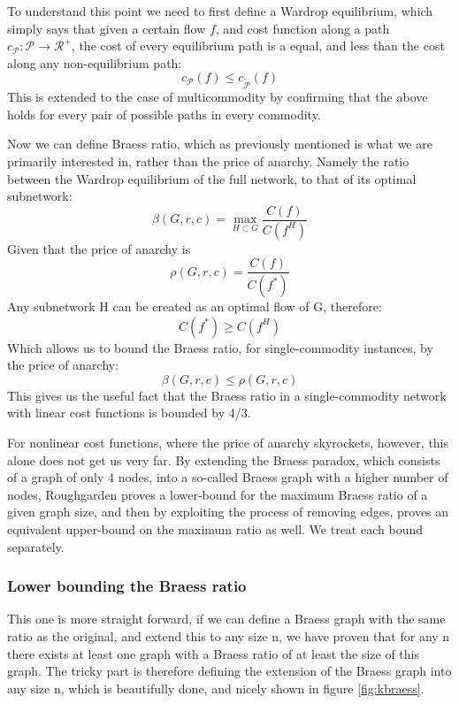 \documentclass[a4paper,12pt]{article}
\begin{document}
To understand this point we need to first define a Wardrop equilibrium, which simply says that given a certain flow $\textit{f}$, and cost function along a path $c_{\mathcal{P}}: \mathcal{P} \rightarrow \mathcal{R}^+$, the cost of every equilibrium path is a equal, and less than the cost along any non-equilibrium path:
%
$$
c_{\mathcal{P}}(\textit{f}) \leq c_{\widetilde{\mathcal{P}}}(\textit{f} )
$$
%
This is extended to the case of multicommodity by confirming that the above holds for every pair of possible paths in every commodity.

Now we can define Braess ratio, which as previously mentioned is what we are primarily interested in, rather than the price of anarchy. Namely the ratio between the Wardrop equilibrium of the full network, to that of its optimal subnetwork:
%
$$
\beta (G, r, c) = \max_{H \subset G} \frac{C(\textit{f})}{C(\textit{f}^H)}
$$
%
Given that the price of anarchy is
%
$$
\rho (G, r, c) = \frac{C(\textit{f})}{C(\textit{f}^*)}
$$
%
Any subnetwork H can be created as an optimal flow of G, therefore:
%
$$
C(\textit{f}^*) \geq C(\textit{f}^H)
$$
%
Which allows us to bound the Braess ratio, for single-commodity instances, by the price of anarchy:
%
$$
\beta (G, r, c) \leq \rho (G, r, c)
$$
%
This gives us the useful fact that the Braess ratio in a single-commodity network with linear cost functions is bounded by 4/3.

For nonlinear cost functions, where the price of anarchy skyrockets, however, this alone does not get us very far. By extending the Braess paradox, which consists of a graph of only 4 nodes, into a so-called Braess graph with a higher number of nodes, Roughgarden proves a lower-bound for the maximum Braess ratio of a given graph size, and then by exploiting the process of removing edges, proves an equivalent upper-bound on the maximum ratio as well. We treat each bound separately.

\subsubsection*{Lower bounding the Braess ratio}

This one is more straight forward, if we can define a Braess graph with the same ratio as the original, and extend this to any size n, we have proven that for any n there exists at least one graph with a Braess ratio of at least the size of this graph. The tricky part is therefore defining the extension of the Braess graph into any size n, which is beautifully done, and nicely shown in figure \ref{fig:kbraess}. 
\end{document}
